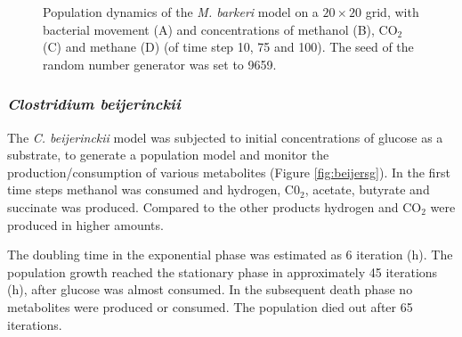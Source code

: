 \begin{figure}[h!]
{\begin{minipage}[t]{0.3\textwidth}
  \end{minipage}
  }
  \caption{Population dynamics of the \emph{M. barkeri} model on a $20\times20$ grid, with bacterial movement (A) and concentrations of methanol (B), CO$_2$ (C) and methane (D) (of time step 10, 75 and 100). The seed of the random number generator was set to 9659.}
  \label{fig:barkerigrids}
\end{figure}
\subsubsection{\textit{Clostridium beijerinckii}}
The \textit{C. beijerinckii} model was subjected to initial concentrations of glucose as a substrate, to generate a population model and monitor the production/consumption of various metabolites (Figure \hyperref[fig:beijersg]{\ref{fig:beijersg}}). In the first time steps methanol was consumed and hydrogen, C0$_2$, acetate, butyrate and succinate was produced. Compared to the other products hydrogen and CO$_2$ were produced in higher amounts.

The doubling time in the exponential phase was estimated as 6 iteration (h).
The population growth reached the stationary phase in approximately 45 iterations (h), after glucose was almost consumed. In the subsequent death phase no metabolites were produced or consumed. The population died out after 65 iterations.

